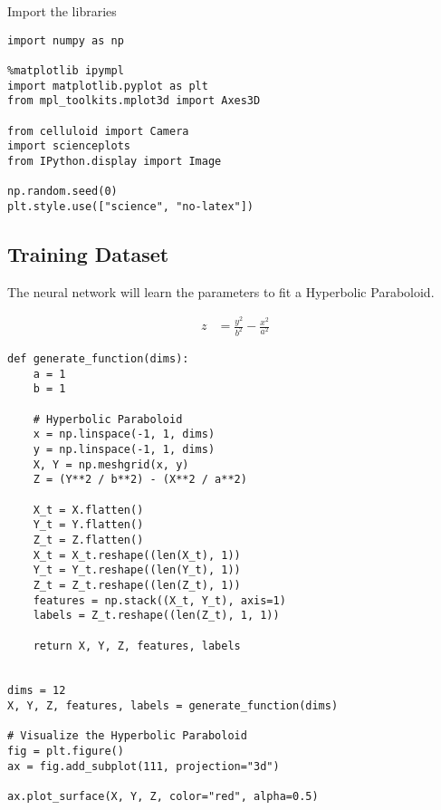\documentclass[openany]{book}
\begin{document}
    Import the libraries

\begin{tcolorbox}
\tiny
\begin{verbatim}
import numpy as np

%matplotlib ipympl
import matplotlib.pyplot as plt
from mpl_toolkits.mplot3d import Axes3D

from celluloid import Camera
import scienceplots
from IPython.display import Image

np.random.seed(0)
plt.style.use(["science", "no-latex"])
\end{verbatim}
\end{tcolorbox}

    \subsection{Training Dataset}\label{training-dataset}

The neural network will learn the parameters to fit a Hyperbolic
Paraboloid.

\begin{align*}
z &= \frac{y^2}{b^2} - \frac{x^2}{a^2}
\end{align*}

\begin{tcolorbox}
\tiny
\begin{verbatim}
def generate_function(dims):
    a = 1
    b = 1

    # Hyperbolic Paraboloid
    x = np.linspace(-1, 1, dims)
    y = np.linspace(-1, 1, dims)
    X, Y = np.meshgrid(x, y)
    Z = (Y**2 / b**2) - (X**2 / a**2)

    X_t = X.flatten()
    Y_t = Y.flatten()
    Z_t = Z.flatten()
    X_t = X_t.reshape((len(X_t), 1))
    Y_t = Y_t.reshape((len(Y_t), 1))
    Z_t = Z_t.reshape((len(Z_t), 1))
    features = np.stack((X_t, Y_t), axis=1)
    labels = Z_t.reshape((len(Z_t), 1, 1))

    return X, Y, Z, features, labels


dims = 12
X, Y, Z, features, labels = generate_function(dims)

# Visualize the Hyperbolic Paraboloid
fig = plt.figure()
ax = fig.add_subplot(111, projection="3d")

ax.plot_surface(X, Y, Z, color="red", alpha=0.5)
\end{verbatim}
\end{tcolorbox}
        
    \begin{center}
    \end{center}
    { \hspace*{\fill} \\}
    
\end{document}
